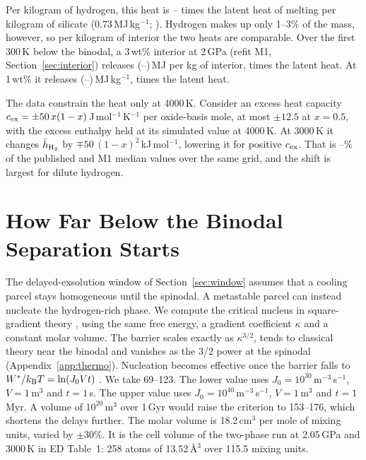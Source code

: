 Per kilogram of hydrogen, this heat is \latentRatioLo{}--\latentRatioHi{} times the latent heat
of melting per kilogram of silicate (0.73\,MJ\,kg$^{-1}$; \cite{tejada2026}). Hydrogen makes up
only 1--3\% of the mass, however, so per kilogram of interior the two heats are comparable.
Over the first 300\,K below the binodal, a 3\,wt\% interior at 2\,GPa (refit M1,
Section~\ref{sec:interior}) releases \intHeatThree{} (\intHeatThreeLo{}--\intHeatThreeHi{})\,MJ
per kg of interior, \latentInteriorThree{} times the latent heat. At 1\,wt\% it releases
\intHeatOne{} (\intHeatOneLo{}--\intHeatOneHi{})\,MJ\,kg$^{-1}$, \latentInteriorOne{} times the
latent heat.

The data constrain the heat only at 4000\,K. Consider an excess heat capacity
$c_{\rm ex} = \pm50\,x(1-x)$\,J\,mol$^{-1}$\,K$^{-1}$ per oxide-basis mole, at most $\pm12.5$ at
$x = 0.5$, with the excess enthalpy held at its simulated value at 4000\,K. At 3000\,K it
changes $\bar h_{\rm H_2}$ by $\mp50\,(1-x)^2$\,kJ\,mol$^{-1}$, lowering it for positive
$c_{\rm ex}$. That is \cexShiftLo{}--\cexShiftHi{}\% of the published and M1 median values
over the same grid, and the shift is largest for dilute hydrogen.

\section{How Far Below the Binodal Separation Starts}\label{sec:kinetics}

The delayed-exsolution window of Section~\ref{sec:window} assumes that a cooling parcel stays
homogeneous until the spinodal. A metastable parcel can instead nucleate the hydrogen-rich
phase. We compute the critical nucleus in square-gradient theory \cite{cahn1958,cahn1959},
using the same free energy, a gradient coefficient $\kappa$ and a constant molar volume. The
barrier scales exactly as $\kappa^{3/2}$, tends to classical theory near the binodal and
vanishes as the 3/2 power at the spinodal (Appendix~\ref{app:thermo}). Nucleation becomes
effective once the barrier falls to $W^*/k_{\rm B}T = \ln(J_0 V t)$ \cite{kashchiev2000}. We
take 69--123. The lower value uses $J_0 = 10^{30}$\,m$^{-3}$\,s$^{-1}$, $V = 1$\,m$^3$ and
$t = 1$\,s. The upper value uses $J_0 = 10^{40}$\,m$^{-3}$\,s$^{-1}$, $V = 1$\,m$^3$ and
$t = 1$\,Myr. A volume of $10^{20}$\,m$^3$ over 1\,Gyr would raise the criterion to 153--176,
which shortens the delays further. The molar volume is 18.2\,cm$^3$ per mole of mixing units,
varied by $\pm30\%$. It is the cell volume of the two-phase run at 2.05\,GPa and 3000\,K in ED
Table~1: 258 atoms of 13.52\,\AA$^3$ over 115.5 mixing units.

